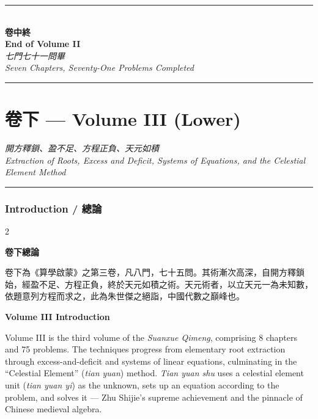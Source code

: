 \documentclass[11pt,a4paper]{article}
\newcommand{\longline}{\noindent\rule{\textwidth}{0.4pt}}
\begin{document}
\newpage

\begin{center}
\longline\\[0.5cm]
{\Large\bfseries\color{chaptercolor} 卷中終}\\[0.3cm]
{\Large\bfseries\color{chaptercolor} End of Volume II}\\[0.5cm]
\textit{七門七十一問畢}\\
\textit{Seven Chapters, Seventy-One Problems Completed}\\[0.5cm]
\longline
\end{center}

\newpage

\part*{\color{chaptercolor}卷下 --- Volume III (Lower)}

\begin{center}
\textit{開方釋鎖、盈不足、方程正負、天元如積}\\
\textit{Extraction of Roots, Excess and Deficit, Systems of Equations, and the Celestial Element Method}
\end{center}

\vspace{0.5cm}
\noindent\rule{\textwidth}{1pt}
\vspace{0.3cm}

\section{Introduction / 總論}
\label{sec:vol3intro}

\begin{paracol}{2}
\begin{leftcolumn}
\noindent\textbf{卷下總論}

卷下為《算學啟蒙》之第三卷，凡八門，七十五問。其術漸次高深，自開方釋鎖始，經盈不足、方程正負，終於天元如積之術。天元術者，以立天元一為未知數，依題意列方程而求之，此為朱世傑之絕詣，中國代數之巔峰也。
\end{leftcolumn}

\switchcolumn

\noindent\textbf{Volume III Introduction}

Volume III is the third volume of the \textit{Suanxue Qimeng}, comprising 8 chapters and 75 problems. The techniques progress from elementary root extraction through excess-and-deficit and systems of linear equations, culminating in the ``Celestial Element'' (\textit{tian yuan}) method. \textit{Tian yuan shu} uses a celestial element unit (\textit{tian yuan yi}) as the unknown, sets up an equation according to the problem, and solves it --- Zhu Shijie's supreme achievement and the pinnacle of Chinese medieval algebra.
\end{paracol}
\end{document}
